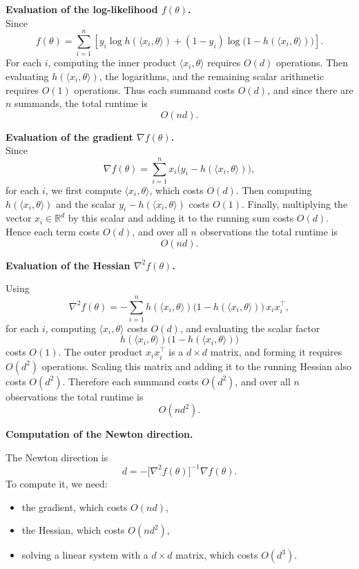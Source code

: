 \documentclass{article}
\begin{document}
\textbf{Evaluation of the log-likelihood \(f(\theta)\).}
\\ Since 
\[
f(\theta)
=
\sum_{i=1}^n
\left[
y_i \log h(\langle x_i,\theta\rangle)
+
(1-y_i)\log\bigl(1-h(\langle x_i,\theta\rangle)\bigr)
\right].
\]
For each \(i\), computing the inner product \(\langle x_i,\theta\rangle\) requires \(O(d)\) operations.  
Then evaluating \(h(\langle x_i,\theta\rangle)\), the logarithms, and the remaining scalar arithmetic requires \(O(1)\) operations.  
Thus each summand costs \(O(d)\), and since there are \(n\) summands, the total runtime is
\[
O(nd).
\]

\textbf{Evaluation of the gradient \(\nabla f(\theta)\).}
\\ Since
\[
\nabla f(\theta)=\sum_{i=1}^n x_i\bigl(y_i-h(\langle x_i,\theta\rangle)\bigr),
\]
for each \(i\), we first compute \(\langle x_i,\theta\rangle\), which costs \(O(d)\).  
Then computing \(h(\langle x_i,\theta\rangle)\) and the scalar \(y_i-h(\langle x_i,\theta\rangle)\) costs \(O(1)\).  
Finally, multiplying the vector \(x_i\in\mathbb{R}^d\) by this scalar and adding it to the running sum costs \(O(d)\).  
Hence each term costs \(O(d)\), and over all \(n\) observations the total runtime is
\[
O(nd).
\]

\textbf{Evaluation of the Hessian \(\nabla^2 f(\theta)\).}

Using
\[
\nabla^2 f(\theta)
=
-\sum_{i=1}^n
h(\langle x_i,\theta\rangle)\bigl(1-h(\langle x_i,\theta\rangle)\bigr)\,x_i x_i^\top,
\]
for each \(i\), computing \(\langle x_i,\theta\rangle\) costs \(O(d)\), and evaluating the scalar factor
\[
h(\langle x_i,\theta\rangle)\bigl(1-h(\langle x_i,\theta\rangle)\bigr)
\]
costs \(O(1)\).  
The outer product \(x_i x_i^\top\) is a \(d\times d\) matrix, and forming it requires \(O(d^2)\) operations.  
Scaling this matrix and adding it to the running Hessian also costs \(O(d^2)\).  
Therefore each summand costs \(O(d^2)\), and over all \(n\) observations the total runtime is
\[
O(nd^2).
\]

\textbf{Computation of the Newton direction.}

The Newton direction is
\[
d=-\bigl[\nabla^2 f(\theta)\bigr]^{-1}\nabla f(\theta).
\]
To compute it, we need:

\begin{itemize}
    \item the gradient, which costs \(O(nd)\),
    \item the Hessian, which costs \(O(nd^2)\),
    \item solving a linear system with a \(d\times d\) matrix, which costs \(O(d^3)\).
\end{itemize}
\end{document}

